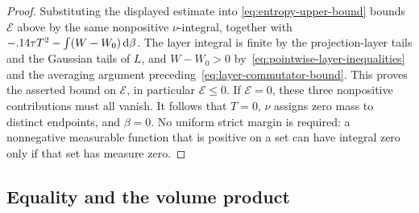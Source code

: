 \begin{proof}
Substituting the displayed estimate into \eqref{eq:entropy-upper-bound} bounds $\mathcal{E}$ above by the same nonpositive $\nu$-integral, together with $-.14\tau T^2-\int(W-W_0)\,\mathrm{d} \beta$. The layer integral is finite by the projection-layer tails and the Gaussian tails of $L$, and $W-W_0>0$ by~\eqref{eq:pointwise-layer-inequalities} and the averaging argument preceding~\eqref{eq:layer-commutator-bound}.  This proves the asserted bound on $\mathcal{E}$, in particular $\mathcal{E}\le0$. If $\mathcal{E}=0$, these three nonpositive contributions must all vanish. It follows that $T=0$, $\nu$ assigns zero mass to distinct endpoints, and $\beta=0$.  No uniform strict margin is required: a nonnegative measurable function that is positive on a set can have integral zero only if that set has measure zero.
\end{proof}

\subsection{Equality and the volume product}

